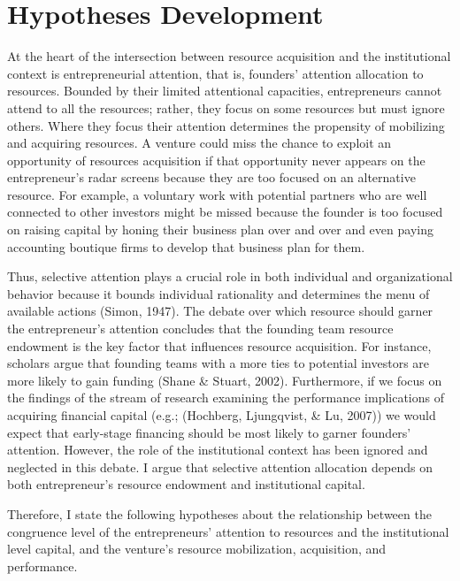 \documentclass[
  english,
  man]{apa6}
\begin{document}
\hypertarget{hypotheses-development}{%
\section{Hypotheses Development}\label{hypotheses-development}}

At the heart of the intersection between resource acquisition and the institutional context is entrepreneurial attention, that is, founders' attention allocation to resources. Bounded by their limited attentional capacities, entrepreneurs cannot attend to all the resources; rather, they focus on some resources but must ignore others. Where they focus their attention determines the propensity of mobilizing and acquiring resources. A venture could miss the chance to exploit an opportunity of resources acquisition if that opportunity never appears on the entrepreneur's radar screens because they are too focused on an alternative resource. For example, a voluntary work with potential partners who are well connected to other investors might be missed because the founder is too focused on raising capital by honing their business plan over and over and even paying accounting boutique firms to develop that business plan for them.

Thus, selective attention plays a crucial role in both individual and organizational behavior because it bounds individual rationality and determines the menu of available actions (Simon, 1947). The debate over which resource should garner the entrepreneur's attention concludes that the founding team resource endowment is the key factor that influences resource acquisition. For instance, scholars argue that founding teams with a more ties to potential investors are more likely to gain funding (Shane \& Stuart, 2002). Furthermore, if we focus on the findings of the stream of research examining the performance implications of acquiring financial capital (e.g.; (Hochberg, Ljungqvist, \& Lu, 2007)) we would expect that early-stage financing should be most likely to garner founders' attention. However, the role of the institutional context has been ignored and neglected in this debate. I argue that selective attention allocation depends on both entrepreneur's resource endowment and institutional capital.

Therefore, I state the following hypotheses about the relationship between the congruence level of the entrepreneurs' attention to resources and the institutional level capital, and the venture's resource mobilization, acquisition, and performance.
\end{document}

